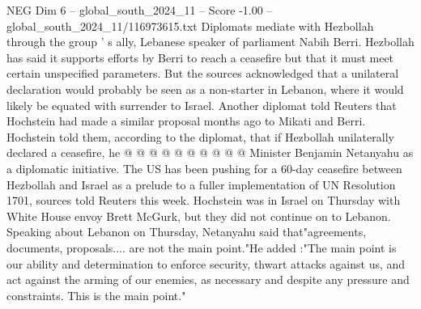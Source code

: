 \begin{textsample}{NEG Dim 6 – global\_south\_2024\_11 – Score -1.00 – global\_south\_2024\_11/116973615.txt}
Diplomats mediate with Hezbollah through the group ' s ally, Lebanese speaker of parliament Nabih Berri.
Hezbollah has said it supports efforts by Berri to reach a ceasefire but that it must meet certain unspecified parameters.
But the sources acknowledged that a unilateral declaration would probably be seen as a non-starter in Lebanon, where it would likely be equated with surrender to Israel.
Another diplomat told Reuters that Hochstein had made a similar proposal months ago to Mikati and Berri.
Hochstein told them, according to the diplomat, that if Hezbollah unilaterally declared a ceasefire, he @ @ @ @ @ @ @ @ @ @ Minister Benjamin Netanyahu as a diplomatic initiative.
The US has been pushing for a 60-day ceasefire between Hezbollah and Israel as a prelude to a fuller implementation of UN Resolution 1701, sources told Reuters this week.
Hochstein was in Israel on Thursday with White House envoy Brett McGurk, but they did not continue on to Lebanon.
Speaking about Lebanon on Thursday, Netanyahu said that"agreements, documents, proposals.... are not the main point."He added :"The main point is our ability and determination to enforce security, thwart attacks against us, and act against the arming of our enemies, as necessary and despite any pressure and constraints.
This is the main point."

\end{textsample}
